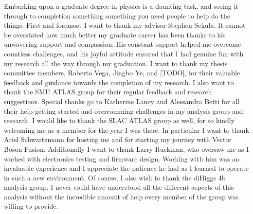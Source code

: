 
Embarking upon a graduate degree in physics is a daunting task,
    and seeing it through to completion something something you need people
    to help do the things.
First and foremost I want to thank my advisor Stephen Sekula.
It cannot be overstated how much better my graduate career has been
    thanks to his unwavering support and compassion.
His constant support helped me overcome countless challenges,
    and his joyful attitude ensured that I had genuine fun
    with my research all the way through my graduation.
I want to thank my thesis committee members,
    Roberto Vega, Jingbo Ye, and [TODO],
    for their valuable feedback and guidance towards the completion of my research.
I also want to thank the SMU ATLAS group for their regular feedback and research suggestions.
Special thanks go to Katherine Laney and Alessandra Betti %
    for all their help getting started and overcomming challenges in my analysis group and research.
I would like to thank the SLAC ATLAS group as well,
    for so kindly welcoming me as a member for the year I was there.
In particular I want to thank Ariel Schwartzmann for hosting me
    and for starting my journey with Vector Boson Fusion.
Additionally I want to thank Larry Ruckman,
    who oversaw me as I worked with electronics testing and firmware design.
Working with him was an invaluable experience
    and I appreciate the patience he had as I learned to operate in such a new environment.
Of course, I also wish to thank the diHiggs 4b analysis group.
I never could have understood all the different aspects of this analysis without the incredible amount of help
    every member of the group was willing to provide.


